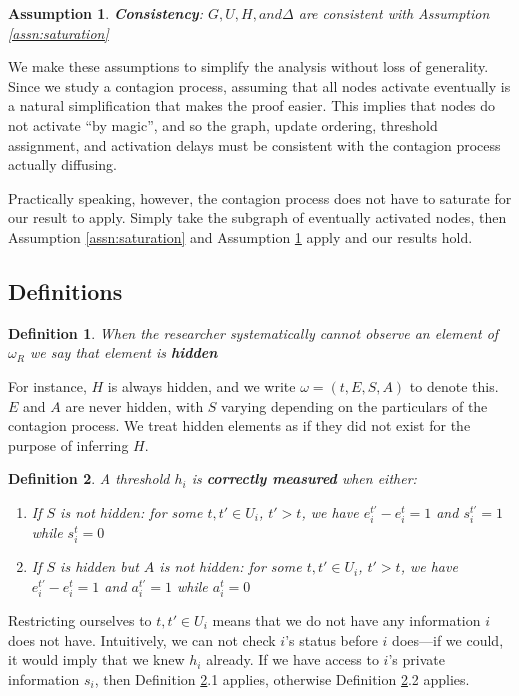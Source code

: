 \documentclass[a4paper]{article}
\newtheorem{definition}{Definition}
\newtheorem{assn}{Assumption}
\begin{document}
\begin{assn} \label{assn:consistency}
\textbf{Consistency}: $G, U, H, and \Delta$ are consistent with Assumption \ref{assn:saturation}
\end{assn}

\noindent
We make these assumptions to simplify the analysis without loss of generality. Since we study a contagion process, assuming that all nodes activate eventually is a natural simplification that makes the proof easier. This implies that nodes do not activate ``by magic'', and so the graph, update ordering, threshold assignment, and activation delays must be consistent with the contagion process actually diffusing.

Practically speaking, however, the contagion process does not have to saturate for our result to apply. Simply take the subgraph of eventually activated nodes, then Assumption \ref{assn:saturation} and Assumption \ref{assn:consistency} apply and our results hold.

\subsection{Definitions}

\begin{definition} \label{def:knowledge}
When the researcher systematically cannot observe an element of $\omega_R$ we say that element is \textbf{hidden}
\end{definition}

\noindent
For instance, $H$ is always hidden, and we write $\omega = (t, E, S, A)$ to denote this. $E$ and $A$ are never hidden, with $S$ varying depending on the particulars of the contagion process. We treat hidden elements as if they did not exist for the purpose of inferring $H$.

\begin{definition} \label{def:measured}
A threshold $h_i$ is \textbf{correctly measured} when either:
\begin{enumerate}
\item If $S$ is not hidden: for some $t, t' \in U_i$, $t' > t$, we have $e_i^{t'} - e_i^t = 1$ and $s_i^{t'} = 1$ while $s_i^t = 0$
\item If $S$ is hidden but $A$ is not hidden: for some $t, t' \in U_i$, $t' > t$, we have $e_i^{t'} - e_i^t = 1$ and $a_i^{t'} = 1$ while $a_i^t = 0$
\end{enumerate}
\end{definition}

\noindent
Restricting ourselves to $t, t' \in U_i$ means that we do not have any information $i$ does not have. Intuitively, we can not check $i$'s status before $i$ does---if we could, it would imply that we knew $h_i$ already. If we have access to $i$'s private information $s_i$, then Definition \ref{def:measured}.1 applies, otherwise Definition \ref{def:measured}.2 applies.
\end{document}
